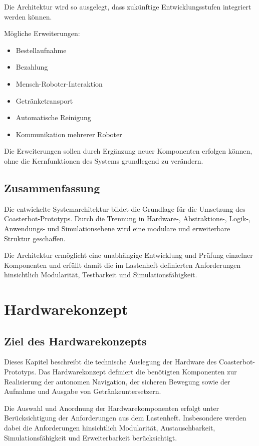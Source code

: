 Die Architektur wird so ausgelegt, dass zukünftige Entwicklungsstufen
integriert werden können.

Mögliche Erweiterungen:

\begin{itemize}
\tightlist
\item
  Bestellaufnahme
\item
  Bezahlung
\item
  Mensch-Roboter-Interaktion
\item
  Getränketransport
\item
  Automatische Reinigung
\item
  Kommunikation mehrerer Roboter
\end{itemize}

Die Erweiterungen sollen durch Ergänzung neuer Komponenten erfolgen
können, ohne die Kernfunktionen des Systems grundlegend zu verändern.

\subsection{Zusammenfassung}\label{zusammenfassung}

Die entwickelte Systemarchitektur bildet die Grundlage für die Umsetzung
des Coasterbot-Prototyps. Durch die Trennung in Hardware-,
Abstraktions-, Logik-, Anwendungs- und Simulationsebene wird eine
modulare und erweiterbare Struktur geschaffen.

Die Architektur ermöglicht eine unabhängige Entwicklung und Prüfung
einzelner Komponenten und erfüllt damit die im Lastenheft definierten
Anforderungen hinsichtlich Modularität, Testbarkeit und
Simulationsfähigkeit.

\section{Hardwarekonzept}\label{hardwarekonzept}

\subsection{Ziel des Hardwarekonzepts}\label{ziel-des-hardwarekonzepts}

Dieses Kapitel beschreibt die technische Auslegung der Hardware des
Coasterbot-Prototyps. Das Hardwarekonzept definiert die benötigten
Komponenten zur Realisierung der autonomen Navigation, der sicheren
Bewegung sowie der Aufnahme und Ausgabe von Getränkeuntersetzern.

Die Auswahl und Anordnung der Hardwarekomponenten erfolgt unter
Berücksichtigung der Anforderungen aus dem Lastenheft. Insbesondere
werden dabei die Anforderungen hinsichtlich Modularität,
Austauschbarkeit, Simulationsfähigkeit und Erweiterbarkeit
berücksichtigt.

